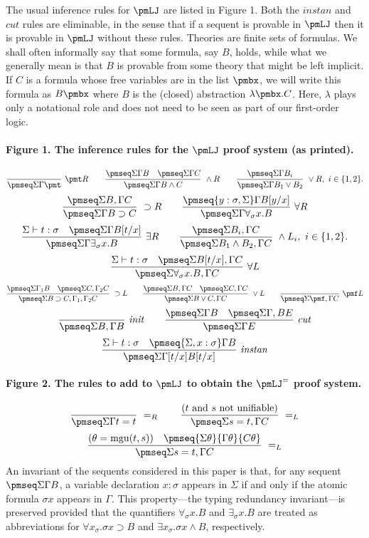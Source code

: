 The usual inference rules for $\pmLJ$ are listed in Figure 1. Both the $\mathit{instan}$ and $\mathit{cut}$ rules are eliminable, in the sense that if a sequent is provable in $\pmLJ$ then it is provable in $\pmLJ$ without these rules.
Theories are finite sets of formulas. We shall often informally say that some formula, say $B$, holds, while what we generally mean is that $B$ is provable from some theory that might be left implicit.
If $C$ is a formula whose free variables are in the list $\pmbx$, we will write this formula as $B\pmbx$ where $B$ is the (closed) abstraction $\lambda\pmbx.C$. Here, $\lambda$ plays only a notational role and does not need to be seen as part of our first-order logic.
\paragraph{Figure 1. The inference rules for the $\pmLJ$ proof system (as printed).}
\[\frac{}{\pmseq\Sigma\Gamma\pmt}\ \pmt R\qquad
\frac{\pmseq\Sigma\Gamma B\quad\pmseq\Sigma\Gamma C}{\pmseq\Sigma\Gamma{B\wedge C}}\ \wedge R\qquad
\frac{\pmseq\Sigma\Gamma{B_i}}{\pmseq\Sigma\Gamma{B_1\vee B_2}}\ \vee R,\ i\in\{1,2\}.\]
\[\frac{\pmseq\Sigma{B,\Gamma}C}{\pmseq\Sigma\Gamma{B\supset C}}\ \supset R\qquad
\frac{\pmseq{y:\sigma,\Sigma}\Gamma{B[y/x]}}{\pmseq\Sigma\Gamma{\forall_\sigma x.B}}\ \forall R\]
\[\frac{\Sigma\vdash t:\sigma\quad\pmseq\Sigma\Gamma{B[t/x]}}{\pmseq\Sigma\Gamma{\exists_\sigma x.B}}\ \exists R\qquad
\frac{\pmseq\Sigma{B_i,\Gamma}C}{\pmseq\Sigma{B_1\wedge B_2,\Gamma}C}\ \wedge L_i,\ i\in\{1,2\}.\]
\[\frac{\Sigma\vdash t:\sigma\quad\pmseq\Sigma{B[t/x],\Gamma}C}{\pmseq\Sigma{\forall_\sigma x.B,\Gamma}C}\ \forall L\]
\[\frac{\pmseq\Sigma{\Gamma_1}B\quad\pmseq\Sigma{C,\Gamma_2}C}{\pmseq\Sigma{B\supset C,\Gamma_1,\Gamma_2}C}\ \supset L\qquad
\frac{\pmseq\Sigma{B,\Gamma}C\quad\pmseq\Sigma{C,\Gamma}C}{\pmseq\Sigma{B\vee C,\Gamma}C}\ \vee L\qquad
\frac{}{\pmseq\Sigma{\pmf,\Gamma}C}\ \pmf L\]
\[\frac{}{\pmseq\Sigma{B,\Gamma}B}\ \mathit{init}\qquad
\frac{\pmseq\Sigma\Gamma B\quad\pmseq\Sigma{\Gamma,B}E}{\pmseq\Sigma\Gamma E}\ \mathit{cut}\]
\[\frac{\Sigma\vdash t:\sigma\quad\pmseq{\Sigma,x:\sigma}\Gamma B}{\pmseq\Sigma{\Gamma[t/x]}{B[t/x]}}\ \mathit{instan}\]
\paragraph{Figure 2. The rules to add to $\pmLJ$ to obtain the $\pmLJ^=$ proof system.}
\[\frac{}{\pmseq\Sigma\Gamma{t=t}}\ =_R\qquad
\frac{(t\text{ and }s\text{ not unifiable})}{\pmseq\Sigma{s=t,\Gamma}C}\ =_L\]
\[\frac{(\theta=\operatorname{mgu}(t,s))\quad\pmseq{\Sigma\theta}{\Gamma\theta}{C\theta}}{\pmseq\Sigma{s=t,\Gamma}C}\ =_L\]
An invariant of the sequents considered in this paper is that, for any sequent $\pmseq\Sigma\Gamma B$, a variable declaration $x:\sigma$ appears in $\Sigma$ if and only if the atomic formula $\sigma x$ appears in $\Gamma$. This property---the typing redundancy invariant---is preserved provided that the quantifiers $\forall_\sigma x.B$ and $\exists_\sigma x.B$ are treated as abbreviations for $\forall x_\sigma.\sigma x\supset B$ and $\exists x_\sigma.\sigma x\wedge B$, respectively.
